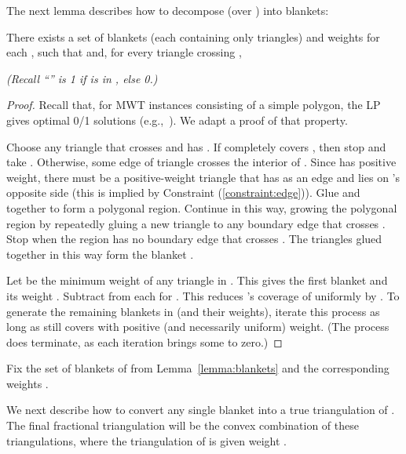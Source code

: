 \documentclass[final]{siamltex}
\begin{document}
The next lemma describes how to decompose  (over ) into blankets:
\begin{lemma}\label{lemma:blankets}
There exists a set  of blankets (each containing only triangles)
  and weights  for each ,
  such that  and, 
  for every triangle  crossing ,
  
  {\em (Recall ``'' is 1 if  is in , else 0.)}
\end{lemma}
\begin{proof}
  Recall that, for MWT instances consisting of a simple polygon, 
  the LP gives optimal 0/1 solutions (e.g.,~\cite[Thm.~7]{dantzig1985triangulations}).
  We adapt a proof of that property.

Choose any triangle  that crosses  and has .
  If  completely covers , then stop and take .
  Otherwise, some edge  of triangle  crosses the interior of .
  Since  has positive weight, there must be a positive-weight triangle  
  that has  as an edge and lies on 's opposite side
  (this is implied by Constraint (\ref{constraint:edge})).
  Glue  and  together to form a polygonal region.
  Continue in this way, growing the polygonal region by
  repeatedly gluing a new triangle to any boundary edge  that crosses .
  Stop when the region has no boundary edge that crosses .
  The triangles glued together in this way form the blanket .

Let  be the minimum weight of any triangle in .
  This gives the first blanket  and its weight .
  Subtract  from each  for .
  This reduces 's coverage of  uniformly by .
  To generate the remaining blankets in  (and their weights),
  iterate this process as long as  still covers  
  with positive (and necessarily uniform) weight.
  (The process does terminate, as each iteration brings some  to zero.)
\end{proof}

Fix the set  of blankets of  from Lemma~\ref{lemma:blankets}
and the corresponding weights .

We next describe how to convert any single blanket 
into a true triangulation  of .  
The final fractional triangulation
 will be the convex combination of these
triangulations, where the triangulation of  is given weight .
\end{document}
